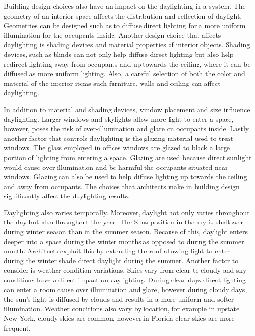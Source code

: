 Building design choices also have an impact on the daylighting in a system.
The geometry of an interior space affects the distribution and reflection of daylight.
Geometries can be designed such as to diffuse direct lighting for a more uniform illumination for the occupants inside.
Another design choice that affects daylighting is shading devices and material properties of interior objects.
Shading devices, such as blinds can not only help diffuse direct lighting but also help redirect lighting away from occupants and up towards the ceiling, where it can be diffused as more uniform lighting.
Also, a careful selection of both the color and material of the interior items such furniture, walls and ceiling can affect daylighting.

In addition to material and shading devices, window placement and size influence daylighting.
Larger windows and skylights allow more light to enter a space, however, poses the risk of over-illumination and glare on occupants inside.
Lastly another factor that controls daylighting is the glazing material used to treat windows.
The glass employed in offices windows are glazed to block a large portion of lighting from entering a space.
Glazing are used because direct sunlight would cause over illumination and be harmful the occupants situated near windows.
Glazing can also be used to help diffuse lighting up towards the ceiling and away from occupants.
The choices that architects make in building design significantly affect the daylighting results.

Daylighting also varies temporally.
Moreover, daylight not only varies throughout the day but also throughout the year.
The Suns position in the sky is shallower during winter season than in the summer season. Because of this, daylight enters deeper into a space during the winter months as opposed to during the summer month.
Architects exploit this by extending the roof allowing light to enter during the winter shade direct daylight during the summer.
Another factor to consider is weather condition variations. Skies vary from clear to cloudy and sky conditions have a direct impact on daylighting. During clear days direct lighting can enter a room cause over illumination and glare, however during cloudy days, the sun's light is diffused by clouds and results in a more uniform and softer illumination.
Weather conditions also vary by location, for example in upstate New York, cloudy skies are common, however in Florida clear skies are more frequent.

